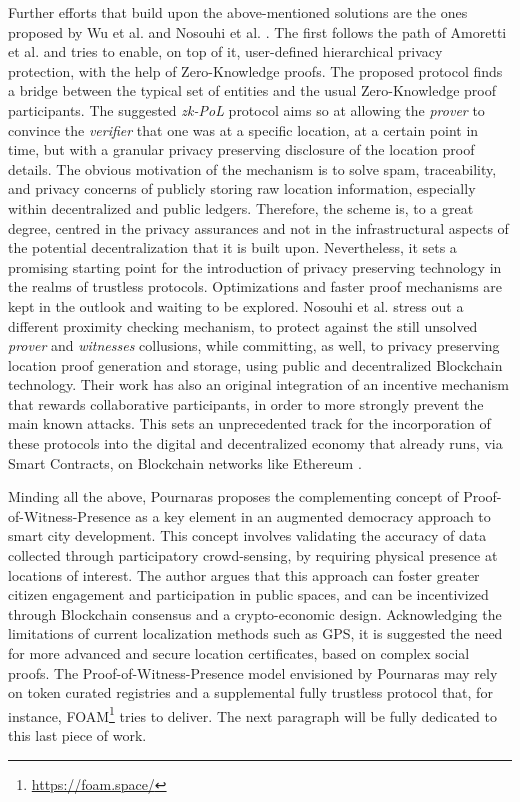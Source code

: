 Further efforts that build upon the above-mentioned solutions are the ones proposed by Wu et al. \cite{wu2020blockchain} and Nosouhi et al. \cite{nosouhi2020blockchain}. The first follows the path of Amoretti et al. \cite{amoretti2018blockchain} and tries to enable, on top of it, user-defined hierarchical privacy protection, with the help of Zero-Knowledge proofs. The proposed protocol finds a bridge between the typical \pol{} set of entities and the usual Zero-Knowledge proof participants. The suggested \emph{zk-PoL} protocol aims so at allowing the \emph{prover} to convince the \emph{verifier} that one was at a specific location, at a certain point in time, but with a granular privacy preserving disclosure of the location proof details. The obvious motivation of the mechanism is to solve spam, traceability, and privacy concerns of publicly storing raw location information, especially within decentralized and public ledgers. Therefore, the scheme is, to a great degree, centred in the privacy assurances and not in the infrastructural aspects of the potential decentralization that it is built upon. Nevertheless, it sets a promising starting point for the introduction of privacy preserving technology in the realms of trustless \pol{} protocols. Optimizations and faster proof mechanisms are kept in the outlook and waiting to be explored. Nosouhi et al. \cite{nosouhi2020blockchain} stress out a different proximity checking mechanism, to protect against the still unsolved \emph{prover} and \emph{witnesses} collusions, while committing, as well, to privacy preserving location proof generation and storage, using public and decentralized Blockchain technology. Their work has also an original integration of an incentive mechanism that rewards collaborative participants, in order to more strongly prevent the main known attacks. This sets an unprecedented track for the incorporation of these \pol{} protocols into the digital and decentralized economy that already runs, via Smart Contracts, on Blockchain networks like Ethereum \cite{nosouhi2020blockchain, buterin2014next}. 

Minding all the above, Pournaras \cite{pournaras2020proof} proposes the complementing concept of Proof-of-Witness-Presence as a key element in an augmented democracy approach to smart city development. This concept involves validating the accuracy of data collected through participatory crowd-sensing, by requiring physical presence at locations of interest. The author argues that this approach can foster greater citizen engagement and participation in public spaces, and can be incentivized through Blockchain consensus and a crypto-economic design. Acknowledging the limitations of current localization methods such as GPS, it is suggested the need for more advanced and secure location certificates, based on complex social proofs. The Proof-of-Witness-Presence model envisioned by Pournaras may rely on token curated registries and a supplemental fully trustless \pol{} protocol that, for instance, FOAM\footnote{\url{https://foam.space/}} tries to deliver. The next paragraph will be fully dedicated to this last piece of work.

